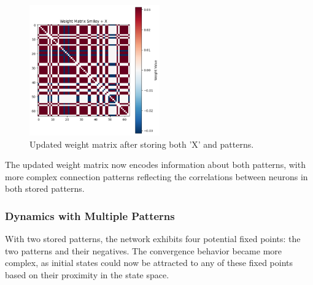 \documentclass{article}
\begin{document}
\begin{figure}[H]
\centering
\includegraphics[width=0.5\textwidth]{Weight Matrix Smiley + X.png}
\caption{Updated weight matrix after storing both 'X' and \smiley{} patterns.}
\label{fig:weight_matrix2}
\end{figure}

The updated weight matrix now encodes information about both patterns, with more complex connection patterns reflecting the correlations between neurons in both stored patterns.


\subsubsection{Dynamics with Multiple Patterns}
With two stored patterns, the network exhibits four potential fixed points: the two patterns and their negatives. The convergence behavior became more complex, as initial states could now be attracted to any of these fixed points based on their proximity in the state space.
\end{document}
